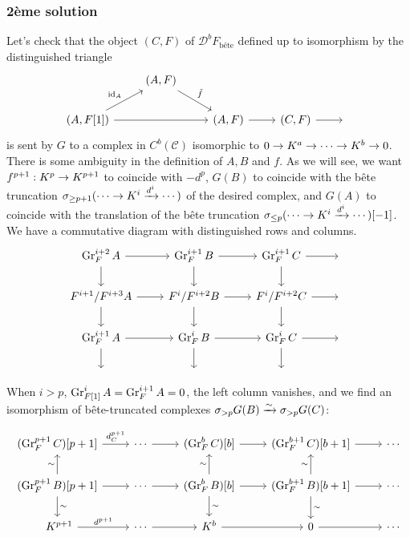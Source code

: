 \documentclass[deligne.tex]{subfiles}
\begin{document}
\subsubsection*{2ème solution}
Let's check that the object $(C,F)$ of $\mathcal D^bF_{\text{b\^ete}}$ 
defined up to isomorphism by the distinguished triangle
\begin{equation*}\begin{tikzcd}
	&(A,F)\arrow[dr,"\tilde f"] \\
	(A,F[1])\arrow[ur,"\id_A"]\arrow[rr]&&(A,F)\arrow[r]&(C,F)\arrow[r]&\;
\end{tikzcd}\end{equation*}
is sent by $G$ to a complex in $C^b(\mathcal C)$ isomorphic to
$0\rightarrow K^a\rightarrow\cdots\rightarrow K^b\rightarrow0$.
There is some ambiguity in the definition of $A,B$ and $f$. As we will see,
we want $f^{p+1}:K^p\rightarrow K^{p+1}$ to coincide with $-d^p$, $G(B)$ to 
coincide with the bête truncation
$\sigma_{\geq p+1}(\cdots\rightarrow K^i\xrightarrow{d^i}\cdots)$ of the desired
complex, and $G(A)$ to coincide with the translation of the bête truncation 
$\sigma_{\leq p}(\cdots\rightarrow K^i\xrightarrow{d^i}\cdots)[-1]$.
We have a commutative diagram with distinguished rows and columns.
\begin{equation*}\begin{tikzcd}
	\Gr_F^{i+2}A\arrow[r]\arrow[d]
	&\Gr_F^{i+1}B\arrow[r]\arrow[d]
	&\Gr_F^{i+1}C\arrow[r]\arrow[d]&\; \\
	F^{i+1}/F^{i+3}A\arrow[r]\arrow[d]
	&F^i/F^{i+2}B\arrow[r]\arrow[d]
	&F^i/F^{i+2}C\arrow[r]\arrow[d]&\; \\
	\Gr_F^{i+1}A\arrow[r]\arrow[d]
	&\Gr^i_FB\arrow[r]\arrow[d]
	&\Gr_F^iC\arrow[r]\arrow[d]&\; \\
	\;&\;&\;
\end{tikzcd}\end{equation*}
When $i>p$, $\operatorname{Gr}_{F[1]}^iA=\operatorname{Gr}_F^{i+1}A=0$, the left column vanishes, and
we find an isomorphism of bête-truncated complexes
$\sigma_{>p}G(B)\xrightarrow\sim\sigma_{>p}G(C)$:
\begin{ceqn}\begin{equation*}\begin{tikzcd}
	(\Gr_F^{p+1}C)[p+1]\arrow[r,"d_C^{p+1}"]
	&\cdots\arrow[r]&(\Gr_F^{b}C)[b]\arrow[r] 
	&(\Gr_F^{b+1}C)[b+1]\arrow[r]
	&\cdots \\
	(\Gr_F^{p+1}B)[p+1]\arrow[r]\arrow[u,"\sim"]\arrow[d,"\sim"]
	&\cdots\arrow[r]
	&(\Gr_F^{b}B)[b]\arrow[r]\arrow[u,"\sim"]\arrow[d,"\sim"]
	&(\Gr_F^{b+1}B)[b+1]\arrow[r]\arrow[u,"\sim"]\arrow[d,"\sim"]
	&\cdots \\\
	K^{p+1}\arrow[r,"d^{p+1}"]&\cdots\arrow[r]
	&K^b\arrow[r]&0\arrow[r]&\cdots
\end{tikzcd}\end{equation*}\end{ceqn}
\end{document}
